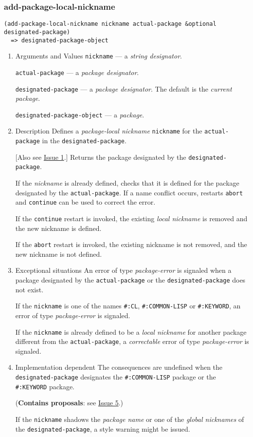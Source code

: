 \documentclass[11pt]{article}
\begin{document}
\subsubsection{add-package-local-nickname}
\label{sec:orgd3afceb}
\begin{verbatim}
(add-package-local-nickname nickname actual-package &optional designated-package)
  => designated-package-object
\end{verbatim}
\begin{enumerate}
\item Arguments and Values
\label{sec:org980d595}
\texttt{nickname} --- a \emph{string designator}.

\texttt{actual-package} --- a \emph{package designator}.

\texttt{designated-package} --- a \emph{package designator}.
The default is the \emph{current package}.

\texttt{designated-package-object} --- a \emph{package}.
\item Description
\label{sec:orgb108cb4}
Defines a \emph{package-local nickname} \texttt{nickname} for the \texttt{actual-package} in the
\texttt{designated-package}.

[Also see \hyperref[sec:org0a8d60e]{Issue 1}.] Returns the package designated by the \texttt{designated-package}.

If the \emph{nickname} is already defined, checks that it is defined for the package
designated by the \texttt{actual-package}. If a name conflict occurs, restarts \texttt{abort}
and \texttt{continue} can be used to correct the error.

If the \texttt{continue} restart is invoked, the existing \emph{local nickname} is removed
and the new nickname is defined.

If the \texttt{abort} restart is invoked, the existing nickname is not removed, and the
new nickname is not defined.
\item Exceptional situations
\label{sec:org7a6d71d}
An error of type \emph{package-error} is signaled when a package designated by the
\texttt{actual-package} or the \texttt{designated-package} does not exist.

If the \texttt{nickname} is one of the names \texttt{\#:CL}, \texttt{\#:COMMON-LISP} or \texttt{\#:KEYWORD}, an
error of type \emph{package-error} is signaled.

If the \texttt{nickname} is already defined to be a \emph{local nickname} for another package
different from the \texttt{actual-package}, a \emph{correctable} error of type \emph{package-error}
is signaled.
\item Implementation dependent
\label{sec:org9e1f4dd}
The consequences are undefined when the \texttt{designated-package} designates the
\texttt{\#:COMMON-LISP} package or the \texttt{\#:KEYWORD} package.

(\textbf{Contains proposals}: see \hyperref[sec:org72887a2]{Issue 5}.)

If the \texttt{nickname} shadows the \emph{package name} or one of the \emph{global nicknames} of
the \texttt{designated-package}, a style warning might be issued.
\end{enumerate}
\end{document}
